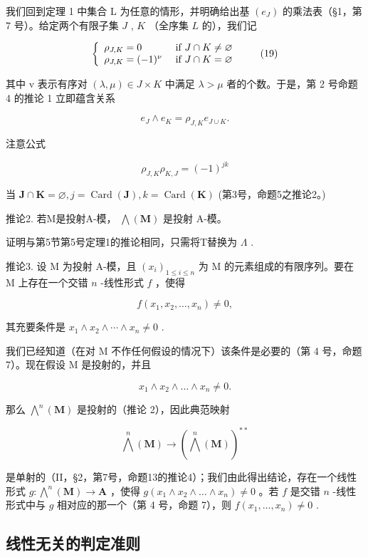 我们回到定理 1 中集合 L 为任意的情形，并明确给出基 \((e_{J})\) 的乘法表（§1，第 7 号）。给定两个有限子集 \(J\) , \(K\) （全序集 \(L\) 的），我们记

\[
\left\{ \begin{array}{l l} \rho_ {J, K} = 0 & \text { if } J \cap K \neq \varnothing \\ \rho_ {J, K} = (- 1) ^ {\nu} & \text { if } J \cap K = \varnothing \end{array} \right.\tag{19}
\]

其中 v 表示有序对 \((\lambda, \mu) \in J \times K\) 中满足 \(\lambda > \mu\) 者的个数。于是，第 2 号命题 4 的推论 1 立即蕴含关系

\[
e _ {J} \wedge e _ {K} = \rho_ {J, K} e _ {J \cup K}.\tag{20}
\]

注意公式

\[
\rho_ {J, K} \rho_ {K, J} = (- 1) ^ {j k}\tag{21}
\]

当 \(\mathbf{J} \cap \mathbf{K} = \varnothing, j = \operatorname{Card}(\mathbf{J}), k = \operatorname{Card}(\mathbf{K})\) (第3号，命题5之推论2。)

推论2. 若M是投射A-模， \(\bigwedge (\mathbf{M})\) 是投射 A-模。

证明与第5节第5号定理1的推论相同，只需将T替换为 \(\Lambda\) .

推论3. 设 M 为投射 A-模，且 \((x_{i})_{1\leqslant i\leqslant n}\) 为 M 的元素组成的有限序列。要在 M 上存在一个交错 \(n\) -线性形式 \(f\) ，使得

\[
f (x _ {1}, x _ {2}, \dots , x _ {n}) \neq 0,
\]

其充要条件是 \(x_{1} \wedge x_{2} \wedge \cdots \wedge x_{n} \neq 0\) .

我们已经知道（在对 M 不作任何假设的情况下）该条件是必要的（第 4 号，命题 7）。现在假设 M 是投射的，并且

\[
x _ {1} \wedge x _ {2} \wedge \dots \wedge x _ {n} \neq 0.
\]

那么 \(\bigwedge^n (\mathbf{M})\) 是投射的（推论 2），因此典范映射

\[
\bigwedge^ {n} (\mathbf {M}) \rightarrow (\bigwedge^ {n} (\mathbf {M})) ^ {* *}
\]

是单射的（II，§2，第7号，命题13的推论4）；我们由此得出结论，存在一个线性形式 \(g: \bigwedge^{n}(\mathbf{M}) \to \mathbf{A}\) ，使得 \(g(x_{1} \wedge x_{2} \wedge \dots \wedge x_{n}) \neq 0\) 。若 \(f\) 是交错 \(n\) -线性形式中与 \(g\) 相对应的那一个（第 4 号，命题 7），则 \(f(x_{1}, \ldots, x_{n}) \neq 0\) .

\subsection{线性无关的判定准则}

